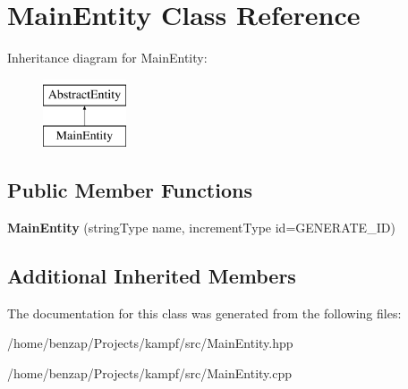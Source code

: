 \hypertarget{classMainEntity}{\section{Main\-Entity Class Reference}
\label{classMainEntity}
}
Inheritance diagram for Main\-Entity\-:\begin{figure}[H]
\begin{center}
\leavevmode
\includegraphics[height=2.000000cm]{classMainEntity}
\end{center}
\end{figure}
\subsection*{Public Member Functions}
\begin{DoxyCompactItemize}
\item 
\hypertarget{classMainEntity_a162bcb866c1ac3af42f9052f68caa28d}{{\bfseries Main\-Entity} (string\-Type name, increment\-Type id=G\-E\-N\-E\-R\-A\-T\-E\-\_\-\-I\-D)}\label{classMainEntity_a162bcb866c1ac3af42f9052f68caa28d}

\end{DoxyCompactItemize}
\subsection*{Additional Inherited Members}


The documentation for this class was generated from the following files\-:\begin{DoxyCompactItemize}
\item 
/home/benzap/\-Projects/kampf/src/Main\-Entity.\-hpp\item 
/home/benzap/\-Projects/kampf/src/Main\-Entity.\-cpp\end{DoxyCompactItemize}
